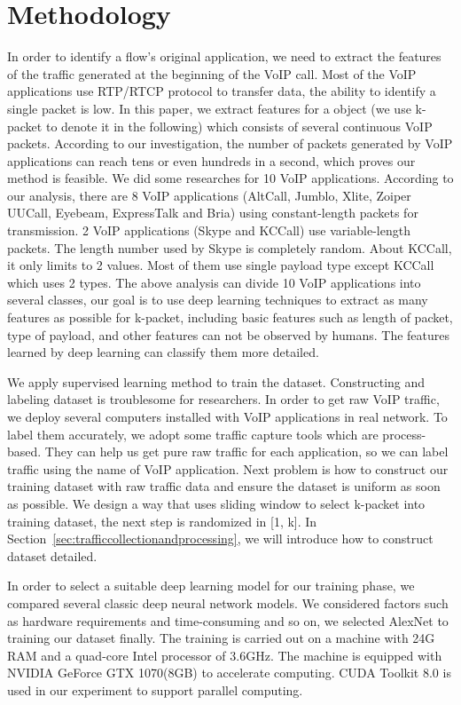 \documentclass[conference]{IEEEtran}
\begin{document}
\section{Methodology}
\label{sec:methodology}
In order to identify a flow's original application, we need to extract the features of the traffic generated at the beginning of the VoIP call. Most of the VoIP applications use RTP/RTCP protocol to transfer data, the ability to identify a single packet is low. In this paper, we extract features for a object (we use k-packet to denote it in the following) which consists of several continuous VoIP packets. According to our investigation, the number of packets generated by VoIP applications can reach tens or even hundreds in a second, which proves our method is feasible. We did some researches for 10 VoIP applications. According to our analysis, there are 8 VoIP applications (AltCall, Jumblo, Xlite, Zoiper UUCall, Eyebeam, ExpressTalk and Bria) using constant-length packets for transmission. 2 VoIP applications (Skype and KCCall) use variable-length packets. The length number used by Skype is completely random. About KCCall, it only limits to 2 values. Most of them use single payload type except KCCall which uses 2 types. The above analysis can divide 10 VoIP applications into several classes, our goal is to use deep learning techniques to extract as many features as possible for k-packet, including basic features such as length of packet, type of payload, and other features can not be observed by humans. The features learned by deep learning can classify them more detailed.

We apply supervised learning method to train the dataset. Constructing and labeling dataset is troublesome for researchers. In order to get raw VoIP traffic, we deploy several computers installed with VoIP applications in real network. To label them accurately, we adopt some traffic capture tools which are process-based. They can help us get pure raw traffic for each application, so we can label traffic using the name of VoIP application. Next problem is how to construct our training dataset with raw traffic data and ensure the dataset is uniform as soon as possible. We design a way that uses sliding window to select k-packet into training dataset, the next step is randomized in [1, k]. In Section~\ref{sec:trafficcollectionandprocessing}, we will introduce how to construct dataset detailed.

In order to select a suitable deep learning model for our training phase, we compared several classic deep neural network models. We considered factors such as hardware requirements and time-consuming and so on, we selected AlexNet to training our dataset finally. The training is carried out on a machine with 24G RAM and a quad-core Intel processor of 3.6GHz. The machine is equipped with NVIDIA GeForce GTX 1070(8GB) to accelerate computing. CUDA Toolkit 8.0 is used in our experiment to support parallel computing.
\end{document}
